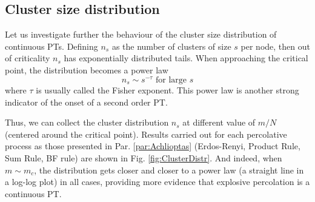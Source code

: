 \subsection{Cluster size distribution}
Let us investigate further the behaviour of the cluster size distribution of continuous PTs. Defining $n_s$ as the number of clusters of size $s$ per node, then out of criticality $n_s$ has exponentially distributed tails. When approaching the critical point, the distribution becomes a power law
$$
n_s \sim s^{-\tau}  \mbox{ for large }s 
$$
where $\tau$ is usually called the Fisher exponent. This power law is another strong indicator of the onset of a second order PT.

Thus, we can collect the cluster distribution $n_s$ at different value of $m / N$ (centered around the critical point). Results carried out for each percolative process as those presented in Par. \ref{par:Achlioptas} (Erdos-Renyi, Product Rule, Sum Rule, BF rule) are shown in Fig. \ref{fig:ClusterDistr}. And indeed, when $m \sim m_c$, the distribution gets closer and closer to a power law (a straight line in a log-log plot) in all cases, providing more evidence that explosive percolation is a continuous PT.
\label{par:css}
